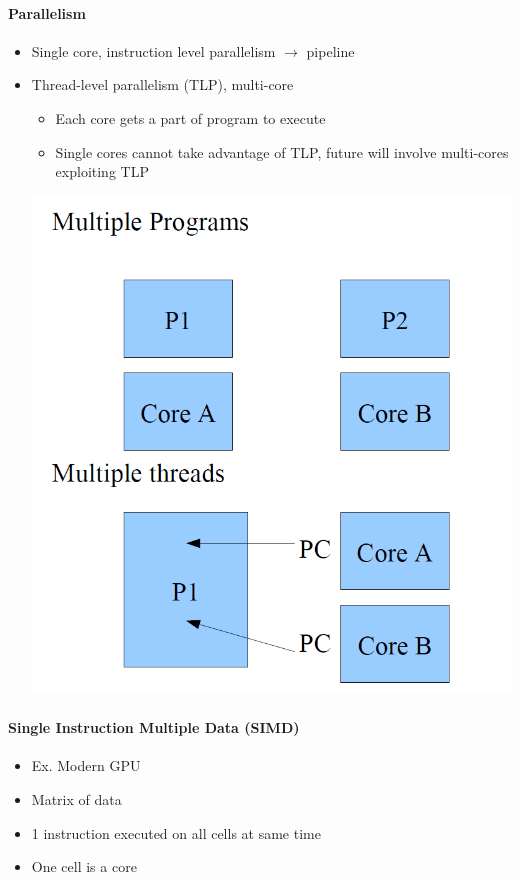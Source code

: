 \documentclass[12 pt]{article}
\begin{document}
\paragraph{Parallelism}
\begin{itemize}
\item Single core, instruction level parallelism $\to$ pipeline
\item Thread-level parallelism (TLP), multi-core
\begin{itemize}
\item Each core gets a part of program to execute
\item Single cores cannot take advantage of TLP, future will involve multi-cores exploiting TLP
\end{itemize}
\includegraphics[scale=0.7]{mct}
\end{itemize}
\paragraph{Single Instruction Multiple Data (SIMD)}
\begin{itemize}
\item Ex. Modern GPU
\item Matrix of data
\item 1 instruction executed on all cells at same time
\item One cell is a core
\end{itemize}
\end{document}
